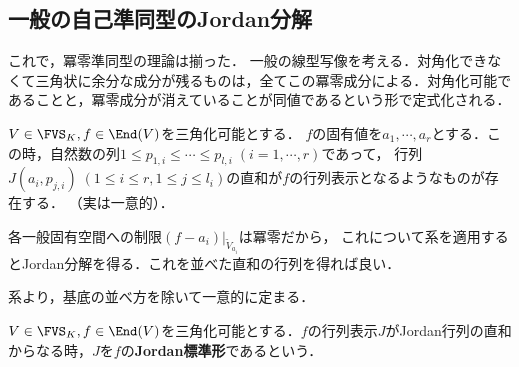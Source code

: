 \documentclass[uplatex, dvipdfmx]{jsreport}
\begin{document}
\subsection{一般の自己準同型のJordan分解}

\begin{tcolorbox}[colframe=ForestGreen, colback=ForestGreen!10!white,breakable,colbacktitle=ForestGreen!40!white,coltitle=black,fonttitle=\bfseries\sffamily,
title=三角化の一意化がJordan分解である]
これで，冪零準同型の理論は揃った．
一般の線型写像を考える．対角化できなくて三角状に余分な成分が残るものは，全てこの冪零成分による．対角化可能であることと，冪零成分が消えていることが同値であるという形で定式化される．
\end{tcolorbox}

\begin{corollary}[一般の線型写像のJordan標準形]
    $V\in\FVS_K,f\in\End(V)$を三角化可能とする．
    $f$の固有値を$a_1,\cdots,a_r$とする．この時，自然数の列$1\le p_{1,i}\le\cdots\le p_{l,i}\;(i=1,\cdots,r)$であって，
    行列$J(a_i,p_{j,i})\;(1\le i\le r,1\le j\le l_i)$の直和が$f$の行列表示となるようなものが存在する．
    （実は一意的）．
\end{corollary}
\begin{Proof}
    各一般固有空間への制限$(f-a_i)|_{\tilde{V}_{a_i}}$は冪零だから，
    これについて系を適用するとJordan分解を得る．これを並べた直和の行列を得れば良い．

    系より，基底の並べ方を除いて一意的に定まる．
\end{Proof}

\begin{definition}
    $V\in\FVS_K,f\in\End(V)$を三角化可能とする．$f$の行列表示$J$がJordan行列の直和からなる時，$J$を$f$の\textbf{Jordan標準形}であるという．
\end{definition}
\end{document}
